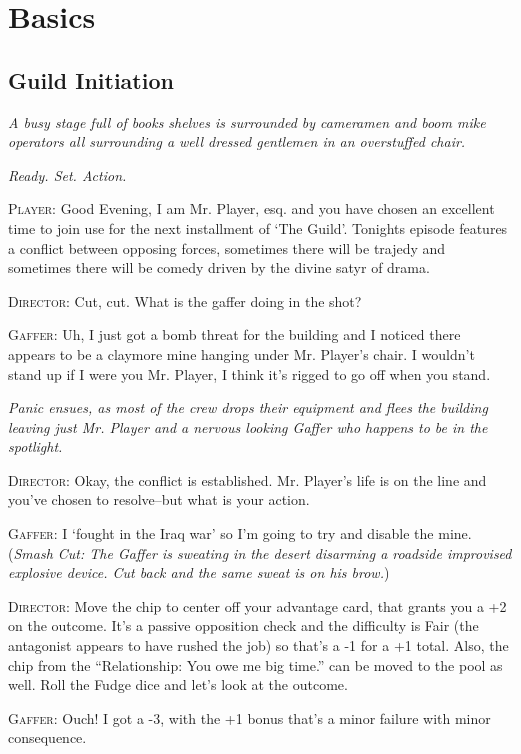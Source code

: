 \chapter{Basics}

\section{Guild Initiation}

\textit{A busy stage full of books shelves is surrounded by cameramen and boom mike operators all surrounding a well dressed
gentlemen in an overstuffed chair.}

\textit{Ready. Set. Action.}

\textsc{Player:} Good Evening, I am Mr. Player, esq. and you have chosen an excellent time to join use for the next installment of `The Guild'. Tonights episode features a conflict between opposing forces, sometimes there will be trajedy and sometimes there will be comedy driven by the divine satyr of drama.

\textsc{Director:} Cut, cut. What is the gaffer doing in the shot?

\textsc{Gaffer:} Uh, I just got a bomb threat for the building and I noticed there appears to be a claymore mine hanging under Mr. Player's chair. I wouldn't stand up if I were you Mr. Player, I think it's rigged to go off when you stand.

\textit{Panic ensues, as most of the crew drops their equipment and flees the building leaving just Mr. Player and a nervous looking Gaffer who happens to be in the spotlight.}

\textsc{Director:} Okay, the conflict is established. Mr. Player's life is on the line and you've chosen to resolve--but what is your action.

\textsc{Gaffer:} I `fought in the Iraq war' so I'm going to try and disable the mine. (\textit{Smash Cut: The Gaffer is sweating in the desert disarming a roadside improvised explosive device. Cut back and the same sweat is on his brow.}) 

\textsc{Director:} Move the chip to center off your advantage card, that grants you a +2 on the outcome. It's a passive opposition check and the difficulty is Fair (the antagonist appears to have rushed the job) so that's a -1 for a +1 total. Also, the chip from the ``Relationship: You owe me big time.'' can be moved to the pool as well. Roll the Fudge dice and let's look at the outcome.

\textsc{Gaffer:} Ouch! I got a -3, with the +1 bonus that's a minor failure with minor consequence.

